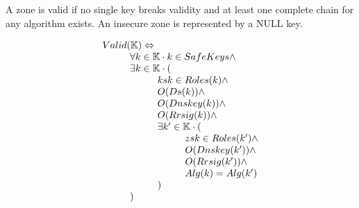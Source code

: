 \documentclass{article}
\begin{document}
A zone is valid if no single key breaks validity and at least one complete
chain for any algorithm exists. An insecure zone is represented by a NULL
key.

\begin{displaymath}
\begin{array}{l}
Valid(\mathbb{K}) \Leftrightarrow \\
\hskip 1cm	\forall k \in \mathbb{K} \cdot k \in SafeKeys \wedge \\
\hskip 1cm	\exists k \in \mathbb{K} \cdot ( \\
\hskip 2cm		ksk \in Roles(k) \wedge \\
\hskip 2cm		O(Ds(k)) \wedge \\
\hskip 2cm		O(Dnskey(k)) \wedge \\
\hskip 2cm		O(Rrsig(k)) \wedge \\
\hskip 2cm		\exists k' \in \mathbb{K} \cdot ( \\
\hskip 3cm			zsk \in Roles(k') \wedge \\
\hskip 3cm			O(Dnskey(k')) \wedge \\
\hskip 3cm			O(Rrsig(k')) \wedge \\
\hskip 3cm			Alg(k)=Alg(k')\\
\hskip 2cm		)\\
\hskip 1cm	)
\end{array}
\end{displaymath}
\end{document}
